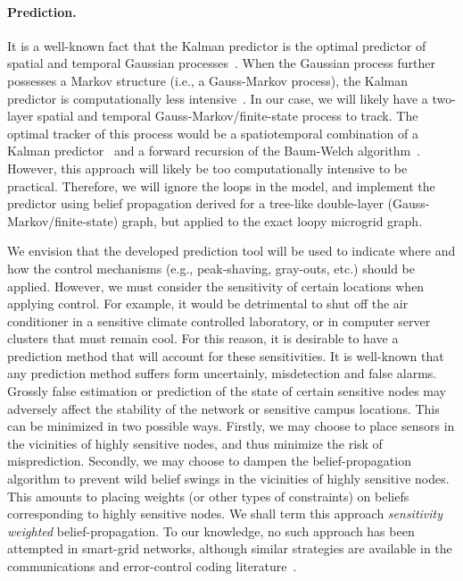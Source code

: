 \paragraph{Prediction.} It is a well-known fact that the Kalman predictor
is the optimal predictor of spatial and temporal Gaussian
processes~\cite{Kalman60,Kalman_Bucy61,Kailath68}. When the Gaussian
process further possesses a Markov structure (i.e., a Gauss-Markov
process), the Kalman predictor is computationally less
intensive~\cite{Kschischang01,Loeliger07}. In our case, we will
likely have a two-layer spatial and temporal
Gauss-Markov/finite-state process to track. The optimal tracker of
this process would be a spatiotemporal combination of a Kalman
predictor~\cite{Kalman60,Kalman_Bucy61} and a forward recursion of
the Baum-Welch algorithm~\cite{Baum66,Bahl74}. However, this
approach will likely be too computationally intensive to be
practical. Therefore, we will ignore the loops in the model, and
implement the predictor using belief propagation derived for a
tree-like double-layer (Gauss-Markov/finite-state) graph, but
applied to the exact loopy microgrid graph.

We envision that the developed prediction tool will be used to
indicate where and how the control mechanisms (e.g., peak-shaving,
gray-outs, etc.) should be applied. However, we must consider the
sensitivity of certain locations when applying control.  For
example, it would be detrimental to shut off the air conditioner in
a sensitive climate controlled laboratory, or in computer server
clusters that must remain cool. For this reason, it is desirable to
have a prediction method that will account for these sensitivities.
It is well-known that any prediction method suffers form
uncertainly, misdetection and false alarms. Grossly false estimation
or prediction of the state of certain sensitive nodes may adversely
affect the stability of the network or sensitive campus locations.
This can be minimized in two possible ways. Firstly, we may choose
to place sensors in the vicinities of highly sensitive nodes, and
thus minimize the risk of misprediction. Secondly, we may choose to
dampen the belief-propagation algorithm to prevent wild belief
swings in the vicinities of highly sensitive nodes. This amounts to
placing weights (or other types of constraints) on beliefs
corresponding to highly sensitive nodes. We shall term this approach
{\em sensitivity weighted} belief-propagation. To our knowledge, no
such approach has been attempted in smart-grid networks, although
similar strategies are available in the communications and
error-control coding literature~\cite{Wang99,Jiang06a,Varnica07}.

